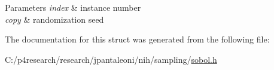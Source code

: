 \begin{DoxyParams}{\-Parameters}
{\em index} & instance number \\
\hline
{\em copy} & randomization seed \\
\hline
\end{DoxyParams}


\-The documentation for this struct was generated from the following file\-:\begin{DoxyCompactItemize}
\item 
\-C\-:/p4research/research/jpantaleoni/nih/sampling/\hyperlink{sobol_8h}{sobol.\-h}\end{DoxyCompactItemize}
